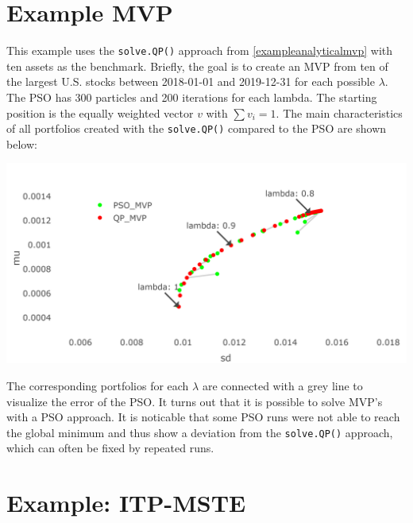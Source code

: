 \documentclass[
  oneside]{book}
\begin{document}
\hypertarget{example-mvp}{%
\section{Example MVP}\label{example-mvp}}

This example uses the \texttt{solve.QP()} approach from \ref{exampleanalyticalmvp} with ten assets as the benchmark. Briefly, the goal is to create an MVP from ten of the largest U.S. stocks between 2018-01-01 and 2019-12-31 for each possible \(\lambda\). The PSO has 300 particles and 200 iterations for each lambda. The starting position is the equally weighted vector \(v\) with \(\textstyle\sum v_i=1\). The main characteristics of all portfolios created with the \texttt{solve.QP()} compared to the PSO are shown below:

\includegraphics{Master_Thesis_files/figure-latex/pso7-1.png}

The corresponding portfolios for each \(\lambda\) are connected with a grey line to visualize the error of the PSO. It turns out that it is possible to solve MVP's with a PSO approach. It is noticable that some PSO runs were not able to reach the global minimum and thus show a deviation from the \texttt{solve.QP()} approach, which can often be fixed by repeated runs.

\hypertarget{example-itp-mste}{%
\section{Example: ITP-MSTE}\label{example-itp-mste}}
\end{document}
